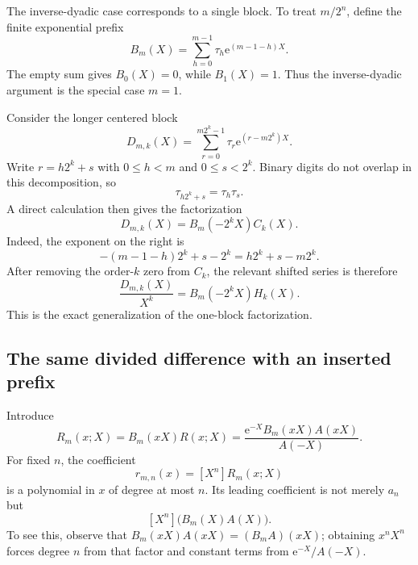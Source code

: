 \documentclass[11pt,oneside]{article}
\theoremstyle{definition}
\theoremstyle{remark}
\newcommand{\coeff}[2]{\left[#1^{#2}\right]}
\newcommand{\e}{\mathrm e}
\newcommand{\tm}{\tau}
\begin{document}
The inverse-dyadic case corresponds to a single block.  To treat
$m/2^n$, define the finite exponential prefix
\begin{equation}\label{p3:eq:Bmdef}
 B_m(X)=\sum_{h=0}^{m-1}\tm_h\e^{(m-1-h)X}.
\end{equation}
The empty sum gives $B_0(X)=0$, while $B_1(X)=1$.  Thus the inverse-dyadic
argument is the special case $m=1$.

Consider the longer centered block
\begin{equation}\label{p3:eq:Dmkdef}
 D_{m,k}(X)=
 \sum_{r=0}^{m2^k-1}\tm_r\e^{(r-m2^k)X}.
\end{equation}
Write $r=h2^k+s$ with $0\le h<m$ and $0\le s<2^k$.  Binary digits do not
overlap in this decomposition, so
\begin{equation}\label{p3:eq:tmblockmultiplicative}
 \tm_{h2^k+s}=\tm_h\tm_s.
\end{equation}
A direct calculation then gives the factorization
\begin{equation}\label{p3:eq:Dfactor}
 \boxed{D_{m,k}(X)=B_m(-2^kX)C_k(X).}
\end{equation}
Indeed, the exponent on the right is
\[
 -(m-1-h)2^k+s-2^k=h2^k+s-m2^k.
\]
After removing the order-$k$ zero from $C_k$, the relevant shifted series is
therefore
\begin{equation}\label{p3:eq:Dshiftedfactor}
 \frac{D_{m,k}(X)}{X^k}=B_m(-2^kX)H_k(X).
\end{equation}
This is the exact generalization of the one-block factorization.

\subsection{The same divided difference with an inserted prefix}

Introduce
\begin{equation}\label{p3:eq:Smparam}
 R_m(x;X)=B_m(xX)R(x;X)
 =\frac{\e^{-X}B_m(xX)A(xX)}{A(-X)}.
\end{equation}
For fixed $n$, the coefficient
\[
 r_{m,n}(x)=\coeff{X}{n}R_m(x;X)
\]
is a polynomial in $x$ of degree at most $n$.  Its leading coefficient is
not merely $a_n$ but
\begin{equation}\label{p3:eq:rmnleading}
 \coeff{X}{n}\bigl(B_m(X)A(X)\bigr).
\end{equation}
To see this, observe that
$B_m(xX)A(xX)=(B_mA)(xX)$; obtaining $x^nX^n$ forces degree $n$ from that
factor and constant terms from $\e^{-X}/A(-X)$.
\end{document}
